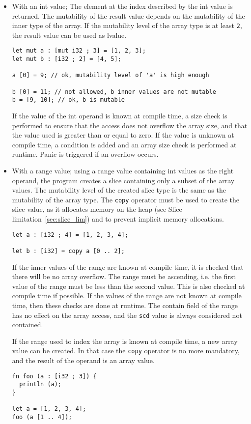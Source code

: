 \begin{itemize}
\item With an int value; The element at the index described by the int value is
  returned. The mutability of the result value depends on the mutability of the
  inner type of the array. If the mutability level of the array type is at least
  \texttt{2}, the result value can be used as lvalue.

  \begin{lstlisting}[style=coloredverbatim]
let mut a : [mut i32 ; 3] = [1, 2, 3];
let mut b : [i32 ; 2] = [4, 5];

a [0] = 9; // ok, mutability level of 'a' is high enough

b [0] = 11; // not allowed, b inner values are not mutable
b = [9, 10]; // ok, b is mutable
  \end{lstlisting}

  If the value of the int operand is known at compile time, a size check is
  performed to ensure that the access does not overflow the array size, and that
  the value used is greater than or equal to zero. If the value is unknown at
  compile time, a condition is added and an array size check is performed at
  runtime. Panic is triggered if an overflow occurs.


\item With a range value; using a range value containing int values as the right
  operand, the program creates a slice containing only a subset of the array
  values. The mutability level of the created slice type is the same as the
  mutability of the array type. The \texttt{copy} operator must be used to create
  the slice value, as it allocates memory on the heap (see Slice
  limitation~\ref{sec:slice_lim}) and to prevent implicit memory allocations.

  \begin{lstlisting}[style=coloredverbatim]
let a : [i32 ; 4] = [1, 2, 3, 4];

let b : [i32] = copy a [0 .. 2];
  \end{lstlisting}

  If the inner values of the range are known at compile time, it is checked that
  there will be no array overflow. The range must be ascending, i.e. the first
  value of the range must be less than the second value. This is also checked at
  compile time if possible. If the values of the range are not known at compile
  time, then these checks are done at runtime. The contain field of the range
  has no effect on the array access, and the \texttt{scd} value is always
  considered not contained.

  If the range used to index the array is known at compile time, a new array
  value can be created. In that case the \texttt{copy} operator is no more
  mandatory, and the result of the operand is an array value.

  \begin{lstlisting}[style=coloredverbatim]
fn foo (a : [i32 ; 3]) {
  println (a);
}

let a = [1, 2, 3, 4];
foo (a [1 .. 4]);
  \end{lstlisting}

\end{itemize}

